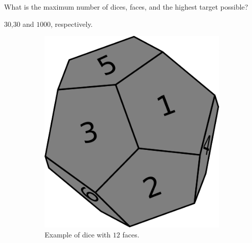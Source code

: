 \begin{QandA}
	\item What is the maximum number of dices, faces, and the highest target possible?
	\begin{answered}
		$30$,$30$ and $1000$, respectively.
	\end{answered}
	
\end{QandA}

\begin{figure}
	\centering
	\begin{subfigure}[t]{0.25\textwidth}
		\includegraphics[width=1\linewidth]{sources/dice_rolls/images/3d_dices}
		\caption{Example of dice with $12$ faces.}
		\label{fig:dice_rolls:12faces_dice}
	 \end{subfigure}
	\hfill
	\begin{subfigure}[t]{0.25\textwidth}

\end{subfigure}
\end{figure}
